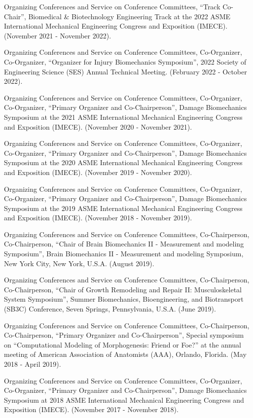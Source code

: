 \documentclass[11pt]{article}
\begin{document}
Organizing Conferences and Service on Conference Committees,
``Track Co-Chair'', Biomedical \& Biotechnology Engineering Track at the
2022 ASME International Mechanical Engineering Congress and Exposition
(IMECE). 
(November 2021 - November 2022).

Organizing Conferences and Service on Conference Committees,
Co-Organizer, Co-Organizer, ``Organizer for Injury Biomechanics
Symposium'', 2022 Society of Engineering Science (SES) Annual Technical
Meeting. 
(February 2022 - October 2022).

Organizing Conferences and Service on Conference Committees,
Co-Organizer, Co-Organizer, ``Primary Organizer and Co-Chairperson'',
Damage Biomechanics Symposium at the 2021 ASME International Mechanical
Engineering Congress and Exposition (IMECE). 
(November 2020 - November
2021).

Organizing Conferences and Service on Conference Committees,
Co-Organizer, Co-Organizer, ``Primary Organizer and Co-Chairperson'',
Damage Biomechanics Symposium at the 2020 ASME International Mechanical
Engineering Congress and Exposition (IMECE). 
(November 2019 - November
2020).

Organizing Conferences and Service on Conference Committees,
Co-Organizer, Co-Organizer, ``Primary Organizer and Co-Chairperson'',
Damage Biomechanics Symposium at the 2019 ASME International Mechanical
Engineering Congress and Exposition (IMECE). 
(November 2018 - November
2019).

Organizing Conferences and Service on Conference Committees,
Co-Chairperson, Co-Chairperson, ``Chair of Brain Biomechanics II -
Measurement and modeling Symposium'', Brain Biomechanics II - Measurement
and modeling Symposium, New York City, New York, U.S.A. 
(August 2019).

Organizing Conferences and Service on Conference Committees,
Co-Chairperson, Co-Chairperson, ``Chair of Growth Remodeling and Repair
II: Musculoskeletal System Symposium'', Summer Biomechanics,
Bioengineering, and Biotransport (SB3C) Conference, Seven Springs,
Pennsylvania, U.S.A. 
(June 2019).

Organizing Conferences and Service on Conference Committees,
Co-Chairperson, Co-Chairperson, ``Primary Organizer and Co-Chairperson'',
Special symposium on ``Computational Modeling of Morphogenesis: Friend or
Foe?'' at the annual meeting of American Association of Anatomists (AAA),
Orlando, Florida. 
(May 2018 - April 2019).

Organizing Conferences and Service on Conference Committees,
Co-Organizer, Co-Organizer, ``Primary Organizer and Co-Chairperson'',
Damage Biomechanics Symposium at 2018 ASME International Mechanical
Engineering Congress and Exposition (IMECE). 
(November 2017 - November
2018).
\end{document}
